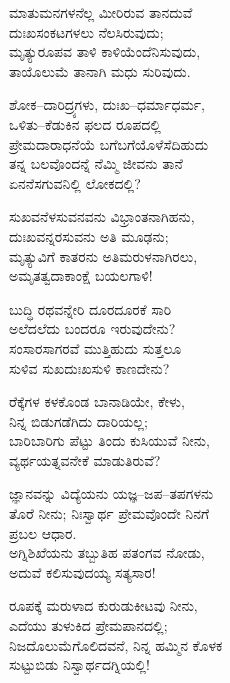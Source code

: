 \begin{myquote}
ಮಾತುಮನಗಳನೆಲ್ಲ ಮೀರಿರುವ ತಾನದುವೆ\\ದುಃಖಸಂಕಟಗಳಲು ನೆಲಸಿರುವುದು;\\ಮೃತ್ಯುರೂಪವ ತಾಳಿ ಕಾಳಿಯೆಂದೆನಿಸುವುದು,\\ತಾಯೊಲುಮೆ ತಾನಾಗಿ ಮಧು ಸುರಿವುದು.
\end{myquote}

\begin{myquote}
ಶೋಕ–ದಾರಿದ್ರ್ಯಗಳು, ದುಃಖ–ಧರ್ಮಾಧರ್ಮ,\\ಒಳಿತು–ಕೆಡುಕಿನ ಫಲದ ರೂಪದಲ್ಲಿ\\ಪ್ರೇಮದಾರಾಧನೆಯೆ ಬಗೆಬಗೆಯೊಳೆಸೆದಿಹುದು\\ತನ್ನ ಬಲವೊಂದನ್ನೆ ನೆಮ್ಮಿ ಜೀವನು ತಾನೆ\\ಏನನೆಸಗುವನಿಲ್ಲಿ ಲೋಕದಲ್ಲಿ?
\end{myquote}

\begin{myquote}
ಸುಖವನೆಳಸುವನವನು ವಿಭ್ರಾಂತನಾಗಿಹನು,\\ದುಃಖವನ್ನರಸುವನು ಅತಿ ಮೂಢನು;\\ಮೃತ್ಯುವಿಗೆ ಕಾತರನು ಅತಿಮರುಳನಾಗಿರಲು,\\ಅಮೃತತ್ವದಾಕಾಂಕ್ಷೆ ಬಯಲಗಾಳಿ!
\end{myquote}

\begin{myquote}
ಬುದ್ಧಿ ರಥವನ್ನೇರಿ ದೂರದೂರಕೆ ಸಾರಿ\\ಅಲೆದಲೆದು ಬಂದರೂ ಇರುವುದೇನು?\\ಸಂಸಾರಸಾಗರವೆ ಮುತ್ತಿಹುದು ಸುತ್ತಲೂ\\ಸುಳಿವ ಸುಖದುಃಖಸುಳಿ ಕಾಣದೇನು?
\end{myquote}

\begin{myquote}
ರೆಕ್ಕೆಗಳ ಕಳಕೊಂಡ ಬಾನಾಡಿಯೇ, ಕೇಳು,\\ನಿನ್ನ ಬಿಡುಗಡೆಗಿದು ದಾರಿಯಲ್ಲ;\\ಬಾರಿಬಾರಿಗು ಪೆಟ್ಟು ತಿಂದು ಕುಸಿಯುವೆ ನೀನು,\\ವ್ಯರ್ಥಯತ್ನವನೇಕೆ ಮಾಡುತಿರುವೆ?
\end{myquote}

\begin{myquote}
ಜ್ಞಾನವನ್ನು ವಿದ್ಯೆಯನು ಯಜ್ಞ–ಜಪ–ತಪಗಳನು\\ತೊರೆ ನೀನು; ನಿಃಸ್ವಾರ್ಥ ಪ್ರೇಮವೊಂದೇ ನಿನಗೆ\\ಪ್ರಬಲ ಆಧಾರ.\\ಅಗ್ನಿಶಿಖೆಯನು ತಬ್ಬುತಿಹ ಪತಂಗವ ನೋಡು,\\ಅದುವೆ ಕಲಿಸುವುದಯ್ಯ ಸತ್ಯಸಾರ!
\end{myquote}

\begin{myquote}
ರೂಪಕ್ಕೆ ಮರುಳಾದ ಕುರುಡುಕೀಟವು ನೀನು,\\ಎದೆಯು ತುಳುಕಿದ ಪ್ರೇಮಪಾನದಲ್ಲಿ;\\ನಿಜದೊಲುಮೆಗೊಲಿದವನೆ, ನಿನ್ನ ಹಮ್ಮಿನ ಕೊಳಕ\\ಸುಟ್ಟುಬಿಡು ನಿಸ್ವಾರ್ಥದಗ್ನಿಯಲ್ಲಿ!
\end{myquote}

